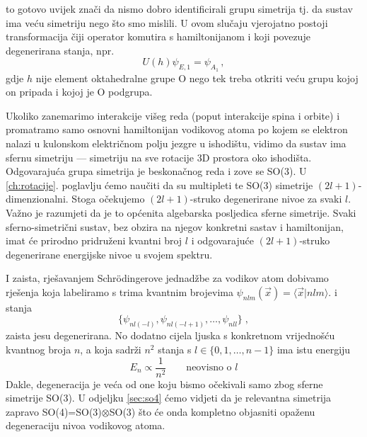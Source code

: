 \begin{primjer}
to gotovo uvijek znači da nismo dobro identificirali grupu simetrija
tj. da sustav ima veću simetriju nego što smo mislili. U ovom slučaju
vjerojatno postoji transformacija čiji operator komutira s hamiltonijanom i
koji povezuje degenerirana stanja, npr.
\begin{displaymath}
 U(h) \psi_{E,1} = \psi_{A_1} \,,
\end{displaymath}
gdje $h$ nije element oktahedralne grupe O nego tek treba otkriti veću grupu kojoj
on pripada i kojoj je O podgrupa.

\end{primjer}


\begin{primjer}


Ukoliko zanemarimo interakcije višeg reda (poput interakcije spina i orbite) i
promatramo samo osnovni hamiltonijan vodikovog atoma po kojem se elektron nalazi u kulonskom 
električnom polju jezgre u ishodištu, vidimo da sustav ima sfernu simetriju --- simetriju
na sve rotacije 3D prostora oko ishodišta. Odgovarajuća grupa simetrija je
beskonačnog reda i zove se SO(3).
U \ref{ch:rotacije}. poglavlju ćemo naučiti da su multipleti te SO(3)
simetrije $(2l+1)$-dimenzionalni.
Stoga očekujemo $(2l+1)$-struko degenerirane nivoe za svaki $l$. 
Važno je razumjeti da je to općenita algebarska posljedica sferne simetrije.
Svaki sferno-simetrični sustav, bez obzira na njegov konkretni sastav
i hamiltonijan, imat će prirodno pridruženi kvantni broj $l$
i odgovarajuće $(2l+1)$-struko degenerirane energijske nivoe u svojem spektru.

I zaista, rješavanjem Schr\"{o}dingerove jednadžbe za vodikov atom
dobivamo rješenja koja labeliramo
s trima kvantnim brojevima  $\psi_{nlm}(\vec{x}) = \langle \vec{x} | nlm \rangle$. 
i stanja
\begin{displaymath}
   \{ \psi_{nl(-l)}, \psi_{nl(-l+1)}, \ldots, \psi_{nll}\} \;,
\end{displaymath}
zaista jesu degenerirana.
No dodatno cijela ljuska s konkretnom vrijednošću kvantnog broja $n$, a
koja sadrži $n^2$ stanja s $l \in \{0, 1, \ldots, n-1\}$
ima istu energiju
\begin{displaymath}
  E_n \propto \frac{1}{n^2} \qquad \text{neovisno o $l$}
\end{displaymath}
Dakle, degeneracija je veća od one koju bismo očekivali samo zbog
sferne simetrije SO(3).
U odjeljku \ref{sec:so4}  ćemo vidjeti da je relevantna simetrija
zapravo SO(4)=SO(3)$\otimes$SO(3) što će onda kompletno objasniti
opaženu degeneraciju nivoa vodikovog atoma.
\end{primjer}

